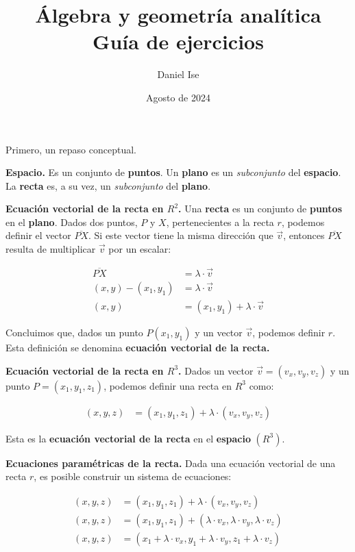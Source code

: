 \documentclass{article}
\title{Álgebra y geometría analítica\\Guía de ejercicios}
\author{Daniel Ise}
\date{Agosto de 2024}
\begin{document}
\maketitle

Primero, un repaso conceptual.

\textbf{Espacio.} Es un conjunto de \textbf{puntos}. Un \textbf{plano} es un
\textit{subconjunto} del \textbf{espacio}. La \textbf{recta} es, a su vez, un
\textit{subconjunto} del \textbf{plano}.

\textbf{Ecuación vectorial de la recta en \(R^2\).} Una \textbf{recta} es un
conjunto de \textbf{puntos} en el \textbf{plano}.
Dados dos puntos, $P$ y $X$, pertenecientes a la recta $r$, podemos definir el
vector \(\overline{PX}\). Si este vector tiene la misma dirección que
\(\vec{v}\), entonces \(\overline{PX}\) resulta de multiplicar \(\vec{v}\)
por un escalar:

\begin{align*}
    \overline{PX}     & = \lambda \cdot \vec{v}             \\
    (x,y) - (x_1,y_1) & = \lambda \cdot \vec{v}             \\
    (x,y)             & = (x_1,y_1) + \lambda \cdot \vec{v}
\end{align*}

Concluimos que, dados un punto $P (x_1,y_1)$ y un vector \(\vec{v}\), podemos
definir $r$. Esta definición se denomina
\textbf{ecuación vectorial de la recta.}

\textbf{Ecuación vectorial de la recta en \(R^3\).} Dados un vector
\(\vec{v} = (v_x,v_y,v_z)\) y un punto \(P = (x_1, y_1, z_1)\), podemos definir
una recta en \(R^3\) como:

\begin{align*}
    (x, y, z) & = (x_1,y_1,z_1) + \lambda \cdot (v_x, v_y, v_z)
\end{align*}

Esta es la \textbf{ecuación vectorial de la recta} en el \textbf{espacio}
$(R^3)$.

\textbf{Ecuaciones paramétricas de la recta.} Dada una ecuación vectorial de una
recta \(r\), es posible construir un sistema de ecuaciones:

\begin{align*}
    (x, y, z) & = (x_1,y_1,z_1) + \lambda \cdot (v_x, v_y, v_z)                               \\
    (x, y, z) & = (x_1,y_1,z_1) + (\lambda \cdot v_x, \lambda \cdot v_y,\lambda \cdot v_z)    \\
    (x, y, z) & = (x_1 + \lambda \cdot v_x, y_1 + \lambda \cdot v_y, z_1 + \lambda \cdot v_z)
\end{align*}
\end{document}
